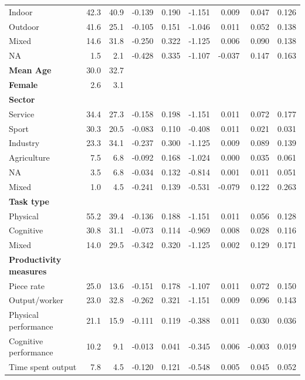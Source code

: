 \documentclass[
]{article}
\begin{document}
\begin{table}[t]
\begin{tabular*}{\linewidth}{@{\extracolsep{\fill}}l|rrrrrrrr}
   Indoor & 42.3 & 40.9 & {-0.139} & 0.190 & -1.151 & 0.009 & 0.047 & 0.126 \\ 
   Outdoor & 41.6 & 25.1 & {-0.105} & 0.151 & -1.046 & 0.011 & 0.052 & 0.138 \\ 
   Mixed & 14.6 & 31.8 & {-0.250} & 0.322 & -1.125 & 0.006 & 0.090 & 0.138 \\ 
   NA & 1.5 & 2.1 & {-0.428} & 0.335 & -1.107 & -0.037 & 0.147 & 0.163 \\ 
{\bfseries Mean Age} & 30.0 & 32.7 & {} &  &  &  &  &  \\ 
{\bfseries Female} & 2.6 & 3.1 & {} &  &  &  &  &  \\ 
{\bfseries Sector} &  &  & {} &  &  &  &  &  \\ 
   Service & 34.4 & 27.3 & {-0.158} & 0.198 & -1.151 & 0.011 & 0.072 & 0.177 \\ 
   Sport & 30.3 & 20.5 & {-0.083} & 0.110 & -0.408 & 0.011 & 0.021 & 0.031 \\ 
   Industry & 23.3 & 34.1 & {-0.237} & 0.300 & -1.125 & 0.009 & 0.089 & 0.139 \\ 
   Agriculture & 7.5 & 6.8 & {-0.092} & 0.168 & -1.024 & 0.000 & 0.035 & 0.061 \\ 
   NA & 3.5 & 6.8 & {-0.034} & 0.132 & -0.814 & 0.001 & 0.011 & 0.051 \\ 
   Mixed & 1.0 & 4.5 & {-0.241} & 0.139 & -0.531 & -0.079 & 0.122 & 0.263 \\ 
{\bfseries Task type} &  &  & {} &  &  &  &  &  \\ 
   Physical & 55.2 & 39.4 & {-0.136} & 0.188 & -1.151 & 0.011 & 0.056 & 0.128 \\ 
   Cognitive & 30.8 & 31.1 & {-0.073} & 0.114 & -0.969 & 0.008 & 0.028 & 0.116 \\ 
   Mixed & 14.0 & 29.5 & {-0.342} & 0.320 & -1.125 & 0.002 & 0.129 & 0.171 \\ 
{\bfseries Productivity measures} &  &  & {} &  &  &  &  &  \\ 
   Piece rate & 25.0 & 13.6 & {-0.151} & 0.178 & -1.107 & 0.011 & 0.072 & 0.150 \\ 
   Output/worker & 23.0 & 32.8 & {-0.262} & 0.321 & -1.151 & 0.009 & 0.096 & 0.143 \\ 
   Physical performance & 21.1 & 15.9 & {-0.111} & 0.119 & -0.388 & 0.011 & 0.030 & 0.036 \\ 
   Cognitive performance & 10.2 & 9.1 & {-0.013} & 0.041 & -0.345 & 0.006 & -0.003 & 0.019 \\ 
   Time spent output & 7.8 & 4.5 & {-0.120} & 0.121 & -0.548 & 0.005 & 0.045 & 0.052 \\ 

\end{tabular*}
\end{table}
\end{document}

